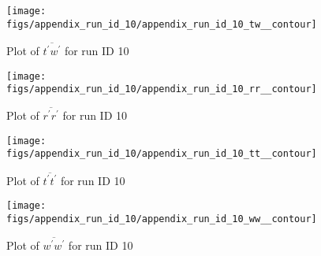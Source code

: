 \begin{figure}[H]
\centering
\texttt{[image: figs/appendix\_run\_id\_10/appendix\_run\_id\_10\_tw\_\_contour]}
\caption{Plot of $\overline{t^\prime w^\prime}$ for run ID 10}
\label{fig:appendix_run_id_10_tw__contour}
\end{figure}


\begin{figure}[H]
\centering
\texttt{[image: figs/appendix\_run\_id\_10/appendix\_run\_id\_10\_rr\_\_contour]}
\caption{Plot of $\overline{r^\prime r^\prime}$ for run ID 10}
\label{fig:appendix_run_id_10_rr__contour}
\end{figure}


\begin{figure}[H]
\centering
\texttt{[image: figs/appendix\_run\_id\_10/appendix\_run\_id\_10\_tt\_\_contour]}
\caption{Plot of $\overline{t^\prime t^\prime}$ for run ID 10}
\label{fig:appendix_run_id_10_tt__contour}
\end{figure}


\begin{figure}[H]
\centering
\texttt{[image: figs/appendix\_run\_id\_10/appendix\_run\_id\_10\_ww\_\_contour]}
\caption{Plot of $\overline{w^\prime w^\prime}$ for run ID 10}
\label{fig:appendix_run_id_10_ww__contour}
\end{figure}


